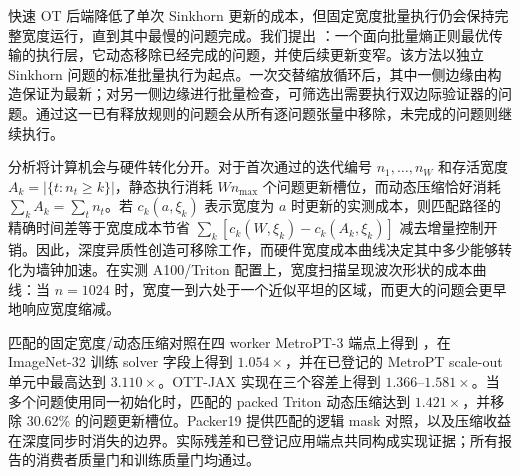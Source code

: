 快速 OT 后端降低了单次 Sinkhorn 更新的成本，但固定宽度批量执行仍会保持完整宽度运行，直到其中最慢的问题完成。我们提出 \policy{}：一个面向批量熵正则最优传输的执行层，它动态移除已经完成的问题，并使后续更新变窄。该方法以独立 Sinkhorn 问题的标准批量执行为起点。一次交替缩放循环后，其中一侧边缘由构造保证为最新；对另一侧边缘进行批量检查，可筛选出需要执行双边际验证器的问题。通过这一已有释放规则的问题会从所有逐问题张量中移除，未完成的问题则继续执行。

分析将计算机会与硬件转化分开。对于首次通过的迭代编号 $n_1,\ldots,n_W$ 和存活宽度 $A_k=|\{t:n_t\geq k\}|$，静态执行消耗 $Wn_{\max}$ 个问题更新槽位，而动态压缩恰好消耗 $\sum_k A_k=\sum_t n_t$。若 $c_k(a,\xi_k)$ 表示宽度为 $a$ 时更新的实测成本，则匹配路径的精确时间差等于宽度成本节省 $\sum_k[c_k(W,\xi_k)-c_k(A_k,\xi_k)]$ 减去增量控制开销。因此，深度异质性创造可移除工作，而硬件宽度成本曲线决定其中多少能够转化为墙钟加速。在实测 A100/Triton 配置上，宽度扫描呈现波次形状的成本曲线：当 $n=1024$ 时，宽度一到六处于一个近似平坦的区域，而更大的问题会更早地响应宽度缩减。

匹配的固定宽度/动态压缩对照在四 worker MetroPT-3 端点上得到 \CMetroCorrectedEndpointSpeedup{}，在 ImageNet-32 训练 solver 字段上得到 $1.054\times$，并在已登记的 MetroPT scale-out 单元中最高达到 $3.110\times$。OTT-JAX 实现在三个容差上得到 $1.366$--$1.581\times$。当多个问题使用同一初始化时，匹配的 packed Triton 动态压缩达到 $1.421\times$，并移除 30.62\% 的问题更新槽位。Packer19 提供匹配的逻辑 mask 对照，以及压缩收益在深度同步时消失的边界。实际残差和已登记应用端点共同构成实现证据；所有报告的消费者质量门和训练质量门均通过。
